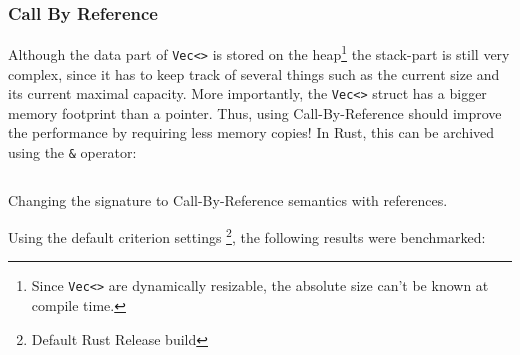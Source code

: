 \subsubsection{Call By Reference}
Although the data part of \texttt{Vec<>} is stored on the heap\footnote{Since \texttt{Vec<>} are dynamically resizable, the absolute size can't be known at compile time.} the stack-part is still very complex, since it has to keep track of several things such as the current size and its current maximal capacity. More importantly, the \texttt{Vec<>} struct has a bigger memory footprint than a pointer. Thus, using Call-By-Reference should improve the performance by requiring less memory copies! In Rust, this can be archived using the \texttt{\&} operator:

\begin{listing}[H]
  \inputminted{rust}{./assets/call_by_ref.rs}
\caption{Changing the signature to Call-By-Reference semantics with references.}
\end{listing}

Using the default criterion settings \footnote{Default Rust Release build}, the following results were benchmarked:


